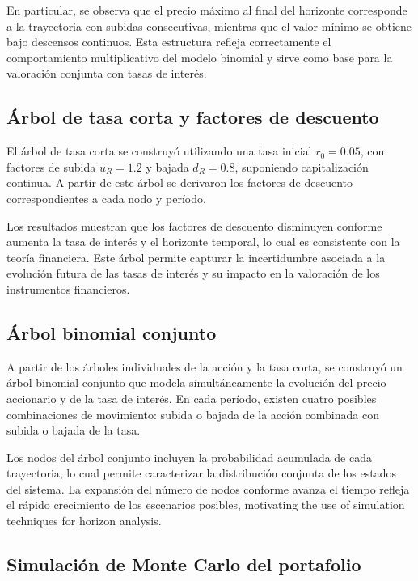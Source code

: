 \documentclass[12pt, a4paper]{article}
\begin{document}
En particular, se observa que el precio máximo al final del horizonte corresponde a la trayectoria con subidas consecutivas, mientras que el valor mínimo se obtiene bajo descensos continuos. Esta estructura refleja correctamente el comportamiento multiplicativo del modelo binomial y sirve como base para la valoración conjunta con tasas de interés.

\subsection{Árbol de tasa corta y factores de descuento}

El árbol de tasa corta se construyó utilizando una tasa inicial \(r_0 = 0.05\), con factores de subida \(u_R = 1.2\) y bajada \(d_R = 0.8\), suponiendo capitalización continua. A partir de este árbol se derivaron los factores de descuento correspondientes a cada nodo y período.

Los resultados muestran que los factores de descuento disminuyen conforme aumenta la tasa de interés y el horizonte temporal, lo cual es consistente con la teoría financiera. Este árbol permite capturar la incertidumbre asociada a la evolución futura de las tasas de interés y su impacto en la valoración de los instrumentos financieros.

\subsection{Árbol binomial conjunto}

A partir de los árboles individuales de la acción y la tasa corta, se construyó un árbol binomial conjunto que modela simultáneamente la evolución del precio accionario y de la tasa de interés. En cada período, existen cuatro posibles combinaciones de movimiento: subida o bajada de la acción combinada con subida o bajada de la tasa.

Los nodos del árbol conjunto incluyen la probabilidad acumulada de cada trayectoria, lo cual permite caracterizar la distribución conjunta de los estados del sistema. La expansión del número de nodos conforme avanza el tiempo refleja el rápido crecimiento de los escenarios posibles, motivating the use of simulation techniques for horizon analysis.

\subsection{Simulación de Monte Carlo del portafolio}
\end{document}
